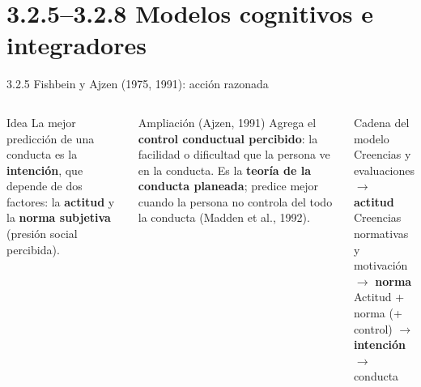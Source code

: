 \documentclass[aspectratio=169,xcolor=dvipsnames]{beamer}
\begin{document}
\section[Cognitivos]{3.2.5--3.2.8 Modelos cognitivos e integradores}

\begin{frame}{3.2.5 Fishbein y Ajzen (1975, 1991): acción razonada}
\begin{columns}[T]
  \begin{block}{Idea}
    \footnotesize La mejor predicción de una conducta es la \textbf{intención}, que depende de dos factores: la \textbf{actitud} y la \textbf{norma subjetiva} (presión social percibida).
  \end{block}
  \begin{block}{Ampliación (Ajzen, 1991)}
    \footnotesize Agrega el \textbf{control conductual percibido}: la facilidad o dificultad que la persona ve en la conducta. Es la \textbf{teoría de la conducta planeada}; predice mejor cuando la persona no controla del todo la conducta (Madden et al., 1992).
  \end{block}
  \begin{alertblock}{Cadena del modelo}
    \footnotesize
    Creencias y evaluaciones $\to$ \textbf{actitud}\\
    Creencias normativas y motivación $\to$ \textbf{norma}\\
    Actitud + norma (+ control) $\to$ \textbf{intención} $\to$ conducta
  \end{alertblock}
\end{columns}
\end{frame}
\end{document}
